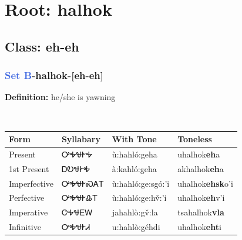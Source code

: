 \needspace{4in}
\section*{Root: halhok}
\nopagebreak
{}
\needspace{3in}
\subsection*{Class: eh-eh}
\nopagebreak
\needspace{2in}
\subsubsection*{\textcolor{RoyalBlue}{Set B}{-}\textbf{halhok}{-}[eh-eh]}
\nopagebreak
\textbf{Definition: } he/she is yawning
\\[0.5em]
\begin{tabularx}{\textwidth}{l X X X}%
\toprule%
\textbf{Form}&\textbf{Syllabary}&\textbf{With Tone}&\textbf{Toneless}\\%
\midrule%
Present&ᎤᎭᏠᎨᎭ&ù:hahló:geha&uhalhok\textbf{eh}a\\%
1st Present&ᎠᎧᏠᎨᎭ&à:kahló:geha&akhalhok\textbf{eh}a\\%
Imperfective&ᎤᎭᏠᎨᏍᎪᎢ&ù:hahló:ge:sgó:’i&uhalhok\textbf{ehsk}o'i\\%
Perfective&ᎤᎭᏠᎨᎲᎢ&ù:hahló:ge:hv̌:’i&uhalhok\textbf{eh}v'i\\%
Imperative&ᏣᎭᏠᎬᎳ&jahahlò:gv̌:la&tsahalhok\textbf{vla}\\%
Infinitive&ᎤᎭᏠᎨᏗ&u:hahlò:géhdi&uhalhok\textbf{eht}i\\%
\bottomrule%
\end{tabularx}
\\[1em]